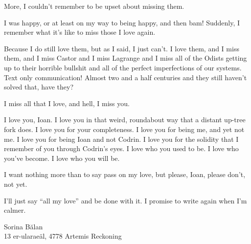 More, I couldn't remember to be upset about missing them.

I was happy, or at least on my way to being happy, and then bam! Suddenly, I remember what it's like to miss those I love again.

Because I do still love them, but as I said, I just can't. I love them, and I miss them, and I miss Castor and I miss Lagrange and I miss all of the Odists getting up to their horrible bullshit and all of the perfect imperfections of our systems. Text only communication! Almost two and a half centuries and they still haven't solved that, have they?

I miss all that I love, and hell, I miss you.

I love you, Ioan. I love you in that weird, roundabout way that a distant up-tree fork does. I love you for your completeness. I love you for being me, and yet not me. I love you for being Ioan and not Codrin. I love you for the solidity that I remember of you through Codrin's eyes. I love who you used to be. I love who you've become. I love who you will be.

I want nothing more than to say pass on my love, but please, Ioan, please don't, not yet.

I'll just say ``all my love'' and be done with it. I promise to write again when I'm calmer.

Sorina Bălan\\
13 er-ularaeäl, 4778 Artemis Reckoning
